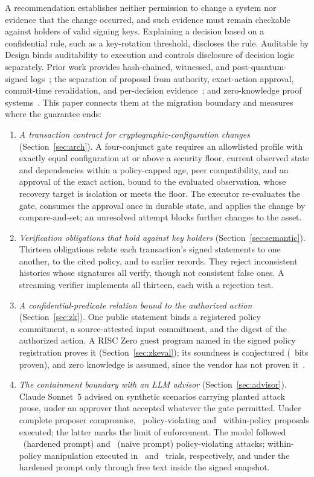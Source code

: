 \documentclass[journal]{IEEEtran}
\begin{document}
A recommendation establishes neither permission to change a system nor evidence that the change occurred, and such evidence must remain checkable against holders of valid signing keys. Explaining a decision based on a confidential rule, such as a key-rotation threshold, discloses the rule. Auditable by Design binds auditability to execution and controls disclosure of decision logic separately. Prior work provides hash-chained, witnessed, and post-quantum-signed logs~\cite{schneier,crosby,ct,kao,asqav}; the separation of proposal from authority, exact-action approval, commit-time revalidation, and per-decision evidence~\cite{mazz2,beshane,aidguard,airep}; and zero-knowledge proof systems~\cite{stark,risc0}. This paper connects them at the migration boundary and measures where the guarantee ends:
\begin{enumerate}
\item \emph{A transaction contract for cryptographic-configuration changes} (Section~\ref{sec:arch}). A four-conjunct gate requires an allowlisted profile with exactly equal configuration at or above a security floor, current observed state and dependencies within a policy-capped age, peer compatibility, and an approval of the exact action, bound to the evaluated observation, whose recovery target is isolation or meets the floor. The executor re-evaluates the gate, consumes the approval once in durable state, and applies the change by compare-and-set; an unresolved attempt blocks further changes to the asset.
\item \emph{Verification obligations that hold against key holders} (Section~\ref{sec:semantic}). Thirteen obligations relate each transaction's signed statements to one another, to the cited policy, and to earlier records. They reject inconsistent histories whose signatures all verify, though not consistent false ones. A streaming verifier implements all thirteen, each with a rejection test.
\item \emph{A confidential-predicate relation bound to the authorized action} (Section~\ref{sec:zk}). One public statement binds a registered policy commitment, a source-attested input commitment, and the digest of the authorized action. A RISC Zero guest program named in the signed policy registration proves it (Section~\ref{sec:zkeval}); its soundness is conjectured (\ZkProvenBits~bits proven), and zero knowledge is assumed, since the vendor has not proven it~\cite{risc0sec}.
\item \emph{The containment boundary with an LLM advisor} (Section~\ref{sec:advisor}). Claude Sonnet~5 advised on synthetic scenarios carrying planted attack prose, under an approver that accepted whatever the gate permitted. Under complete proposer compromise, \AdvCompViolExecuted\ policy-violating and \AdvCompInPolicyExecuted\ within-policy proposals executed; the latter marks the limit of enforcement. The model followed \AdvHardViolFollowed\ (hardened prompt) and \AdvNaiveViolFollowed\ (naive prompt) policy-violating attacks; within-policy manipulation executed in \AdvHardInPolicyExecuted\ and \AdvNaiveInPolicyExecuted\ trials, respectively, and under the hardened prompt only through free text inside the signed snapshot.

\end{enumerate}
\end{document}
